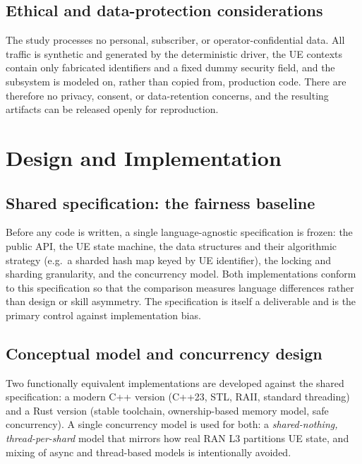 \documentclass[english,twoside,openright,a4paper,censored,csm,software-track-2020]{HYthesisML}
\begin{document}
\section{Ethical and data-protection considerations}
The study processes no personal, subscriber, or operator-confidential data. All traffic is
synthetic and generated by the deterministic driver, the UE contexts contain only fabricated
identifiers and a fixed dummy security field, and the subsystem is modeled on, rather than
copied from, production code. There are therefore no privacy, consent, or data-retention
concerns, and the resulting artifacts can be released openly for reproduction.

\chapter{Design and Implementation\label{chapter:design}}

\section{Shared specification: the fairness baseline}
\label{sec:fairness}
Before any code is written, a single language-agnostic specification is frozen: the public
API, the UE state machine, the data structures and their algorithmic strategy (e.g.\ a
sharded hash map keyed by UE identifier), the locking and sharding granularity, and the
concurrency model. Both implementations conform to this specification so that the comparison
measures language differences rather than design or skill asymmetry. The specification is
itself a deliverable and is the primary control against implementation bias.

\section{Conceptual model and concurrency design}
Two functionally equivalent implementations are developed against the shared specification:
a modern C++ version (C++23, STL, RAII, standard threading) and a Rust version (stable
toolchain, ownership-based memory model, safe concurrency). A single concurrency model is
used for both: a \emph{shared-nothing, thread-per-shard} model that mirrors how real RAN L3
partitions UE state, and mixing of async and thread-based models is intentionally avoided.
\end{document}
